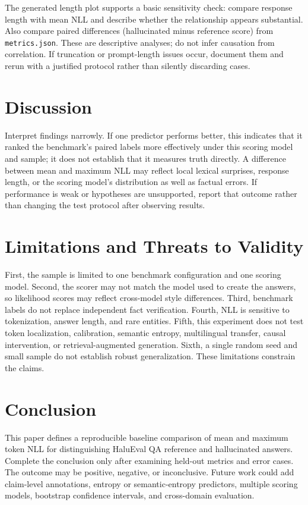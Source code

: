 \documentclass[10pt]{article}
\begin{document}
The generated length plot supports a basic sensitivity check: compare response length with mean NLL and describe whether the relationship appears substantial. Also compare paired differences (hallucinated minus reference score) from \texttt{metrics.json}. These are descriptive analyses; do not infer causation from correlation. If truncation or prompt-length issues occur, document them and rerun with a justified protocol rather than silently discarding cases.

\section{Discussion}
Interpret findings narrowly. If one predictor performs better, this indicates that it ranked the benchmark's paired labels more effectively under this scoring model and sample; it does not establish that it measures truth directly. A difference between mean and maximum NLL may reflect local lexical surprises, response length, or the scoring model's distribution as well as factual errors. If performance is weak or hypotheses are unsupported, report that outcome rather than changing the test protocol after observing results.

\section{Limitations and Threats to Validity}
First, the sample is limited to one benchmark configuration and one scoring model. Second, the scorer may not match the model used to create the answers, so likelihood scores may reflect cross-model style differences. Third, benchmark labels do not replace independent fact verification. Fourth, NLL is sensitive to tokenization, answer length, and rare entities. Fifth, this experiment does not test token localization, calibration, semantic entropy, multilingual transfer, causal intervention, or retrieval-augmented generation. Sixth, a single random seed and small sample do not establish robust generalization. These limitations constrain the claims.

\section{Conclusion}
This paper defines a reproducible baseline comparison of mean and maximum token NLL for distinguishing HaluEval QA reference and hallucinated answers. Complete the conclusion only after examining held-out metrics and error cases. The outcome may be positive, negative, or inconclusive. Future work could add claim-level annotations, entropy or semantic-entropy predictors, multiple scoring models, bootstrap confidence intervals, and cross-domain evaluation.



\end{document}
